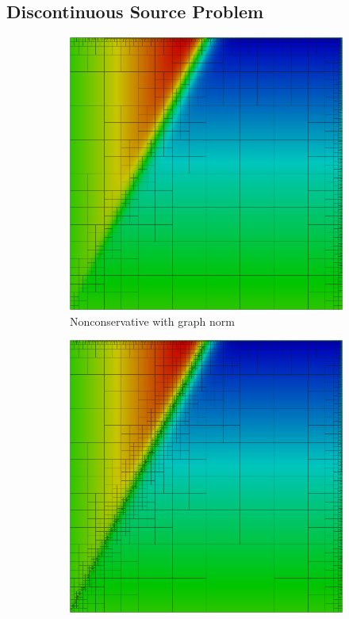 \documentclass[letterpaper]{article}
\begin{document}
\subsection{Discontinuous Source Problem}

\begin{figure}
\centering
\begin{subfigure}[t]{0.45\textwidth}
\centering
\includegraphics[width=\textwidth]{figs/Discontinuous/graph8nc.png}
\caption{Nonconservative with graph norm}
\label{fig:discontinuousGraph8nc}
\end{subfigure}
\begin{subfigure}[t]{0.45\textwidth}
\centering
\includegraphics[width=\textwidth]{figs/Discontinuous/robust8nc.png}

\end{subfigure}
\end{figure}
\end{document}
